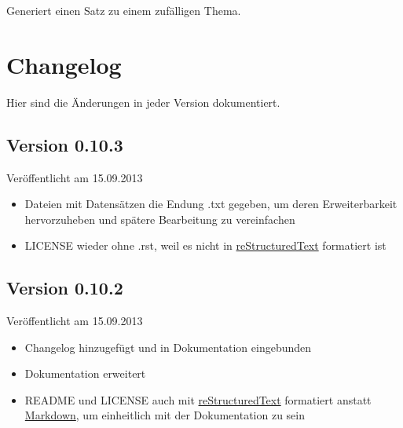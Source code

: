 \documentclass[a4paper,12pt,oneside]{sphinxmanual}
\begin{document}

\begin{fulllineitems}
\label{module:pyzufall.satz.satz_thema}
Generiert einen Satz zu einem zufälligen Thema.

\end{fulllineitems}



\chapter{Changelog}
\label{changelog::doc}\label{changelog:changelog}
Hier sind die Änderungen in jeder Version dokumentiert.


\section{Version 0.10.3}
\label{changelog:version-0-10-3}
Veröffentlicht am 15.09.2013
\begin{itemize}
\item {} 
Dateien mit Datensätzen die Endung .txt gegeben, um deren Erweiterbarkeit hervorzuheben und spätere Bearbeitung zu vereinfachen

\item {} 
LICENSE wieder ohne .rst, weil es nicht in \href{http://de.wikipedia.org/wiki/ReStructuredText}{reStructuredText} formatiert ist

\end{itemize}


\section{Version 0.10.2}
\label{changelog:version-0-10-2}
Veröffentlicht am 15.09.2013
\begin{itemize}
\item {} 
Changelog hinzugefügt und in Dokumentation eingebunden

\item {} 
Dokumentation erweitert

\item {} 
README und LICENSE auch mit \href{http://de.wikipedia.org/wiki/ReStructuredText}{reStructuredText} formatiert anstatt \href{http://de.wikipedia.org/wiki/Markdown}{Markdown}, um einheitlich mit der Dokumentation zu sein

\end{itemize}
\end{document}
